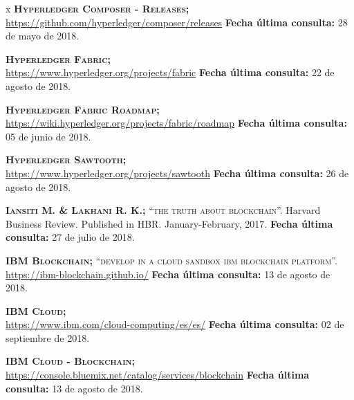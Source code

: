 \begin{thebibliography} {x}
	 \textsc{\textbf{Hyperledger Composer - Releases; }} \\ 
	\url{https://github.com/hyperledger/composer/releases} 
	\newline \textbf{Fecha última consulta:} 28 de mayo de 2018.
			
	 \textsc{\textbf{Hyperledger Fabric; }} \\ 
	\url{https://www.hyperledger.org/projects/fabric} 
	\newline \textbf{Fecha última consulta:} 22 de agosto de 2018.
	
	 \textsc{\textbf{Hyperledger Fabric Roadmap; }} \\ 
	\url{https://wiki.hyperledger.org/projects/fabric/roadmap} 
	\newline \textbf{Fecha última consulta:} 05 de junio de 2018.
	
	 \textsc{\textbf{Hyperledger Sawtooth; }} \\ 
	\url{https://www.hyperledger.org/projects/sawtooth} 
	\newline \textbf{Fecha última consulta:} 26 de agosto de 2018.
				
	 \textsc{\textbf{Iansiti M. \& Lakhani R. K.; }}\textsc{“the truth about blockchain”.} Harvard Business Review. Published in HBR. January-February, 2017. 
	\newline \textbf{Fecha última consulta:} 27 de julio de 2018.
	
	 \textsc{\textbf{IBM Blockchain; }} \textsc{“develop in a cloud sandbox ibm blockchain platform”.} 
	\url{https://ibm-blockchain.github.io/} 
	\newline \textbf{Fecha última consulta:} 13 de agosto de 2018.
	
	 \textsc{\textbf{IBM Cloud; }} \\ 
	\url{https://www.ibm.com/cloud-computing/es/es/} 
	\newline \textbf{Fecha última consulta:} 02 de septiembre de 2018.
		
	 \textsc{\textbf{IBM Cloud - Blockchain; }} \\ 
	\url{https://console.bluemix.net/catalog/services/blockchain} 
	\newline \textbf{Fecha última consulta:} 13 de agosto de 2018.
	

\end{thebibliography}
